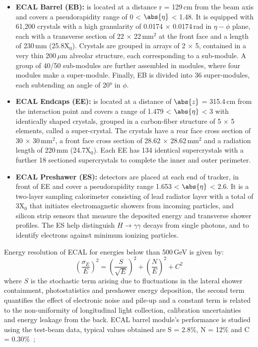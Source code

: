 \begin{itemize}
\item{\textbf{ECAL Barrel (EB):}} is located at a distance r = 129\,cm from the beam axis and covers a pseudorapidity range of 0 < $\abs{\eta}$ < 1.48. It is equipped with 61,200 crystals with a high granularity of 0.0174 $\times$ 0.0174\,rad in $\eta-\phi$ plane, each with a transverse section of 22 $\times$ 22\,mm$^{2}$ at the front face and a length of 230\,mm (25.8X$_{0}$). Crystals are grouped in arrays of 2 $\times$ 5, contained in a very thin 200\,$\mu$m alveolar structure, each corresponding to a sub-module. A group of 40/50 sub-modules are further assembled in modules, where four modules make a super-module. Finally, EB is divided into 36 super-modules, each subtending an angle of \ang{20} in $\phi$. 
\item{\textbf{ECAL Endcaps (EE):}} is located at a distance of $\abs{z}$ = 315.4\,cm from the interaction point and covers a range of 1.479 < $\abs{\eta}$ < 3 with identically shaped crystals, grouped in a carbon-fiber structure of 5 $\times$ 5 elements, called a super-crystal. The crystals have a rear face cross section of 30 $\times$ 30\,mm$^{2}$, a front face cross section of 28.62 $\times$ 28.62\,mm$^{2}$ and a radiation length of 220\,mm (24.7X$_{0}$). Each EE has 134 identical supercrystals with a further 18 sectioned supercrystals to complete the inner and outer perimeter.
\item{\textbf{ECAL Preshawer (ES):}} detectors are placed at each end of tracker, in front of EE and cover a pseudorapidity range 1.653 < $\abs{\eta}$ < 2.6. It is a two-layer sampling calorimeter consisting of lead radiator layer with a total of 3X$_{0}$ that initiates electromagnetic showers from incoming particles, and silicon strip sensors that measure the deposited energy and transverse shower profiles. The ES help distinguish $H \rightarrow \gamma\gamma$ decays from single photons, and to identify electrons against minimum ionizing particles.
\end{itemize}
Energy resolution of ECAL for energies below than 500\,GeV is given by:
\begin{equation}
(\frac{\sigma_{E}}{E})^{2} = (\frac{S}{\sqrt{E}})^{2} + (\frac{N}{E})^{2} + C^{2}
\end{equation}
where $S$ is the stochastic term arising due to fluctuations in the lateral shower containment, photostatistics and preshower energy deposition, the second term quantifies the effect of electronic noise and pile-up and a constant term is related to the non-uniformity of longitudinal light collection, calibration uncertainties and energy leakage from the back. ECAL barrel module's performance is studied using the test-beam data, typical values obtained are S = 2.8\%, N = 12\% and C = 0.30\%~\cite{ecal_resol};

